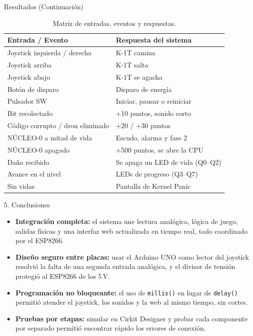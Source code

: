 \documentclass[final]{beamer}
\newlength{\colwidth}
\begin{document}
\begin{frame}[t]
\begin{columns}[t]
\begin{column}{\colwidth}
\begin{block}{Resultados (Continuación)}
    \vspace{1ex}
    \begin{table}
      \centering
      \colorbox{celesteFondo}{%
        \begin{tabular}{l l}
          \toprule
          \textbf{Entrada / Evento} & \textbf{Respuesta del sistema} \\
          \midrule
          Joystick izquierda / derecha & K-1T camina \\
          Joystick arriba & K-1T salta \\
          Joystick abajo & K-1T se agacha \\
          Botón de disparo & Disparo de energía \\
          Pulsador SW & Iniciar, pausar o reiniciar \\
          \midrule
          Bit recolectado & +10 puntos, sonido corto \\
          Código corrupto / dron eliminado & +20 / +30 puntos \\
          NÚCLEO-0 a mitad de vida & Escudo, alarma y fase 2 \\
          NÚCLEO-0 apagado & +500 puntos, se abre la CPU \\
          Daño recibido & Se apaga un LED de vida (Q0--Q2) \\
          Avance en el nivel & LEDs de progreso (Q3--Q7) \\
          Sin vidas & Pantalla de Kernel Panic \\
          \bottomrule
        \end{tabular}%
      }
      \caption{Matriz de entradas, eventos y respuestas.}
    \end{table}
    \vspace{1ex}

  \end{block}

  \begin{block}{5. Conclusiones}
    \begin{itemize}
      \item \textbf{Integración completa:} el sistema une lectura analógica, lógica de juego, salidas físicas y una interfaz web actualizada en tiempo real, todo coordinado por el ESP8266.
      \item \textbf{Diseño seguro entre placas:} usar el Arduino UNO como lector del joystick resolvió la falta de una segunda entrada analógica, y el divisor de tensión protegió al ESP8266 de los 5\,V.
      \item \textbf{Programación no bloqueante:} el uso de \texttt{millis()} en lugar de \texttt{delay()} permitió atender el joystick, los sonidos y la web al mismo tiempo, sin cortes.
      \item \textbf{Pruebas por etapas:} simular en Cirkit Designer y probar cada componente por separado permitió encontrar rápido los errores de conexión.
    \end{itemize}
  \end{block}


\end{column}
\end{columns}
\end{frame}
\end{document}
